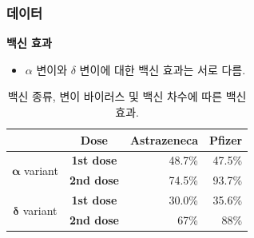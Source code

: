 \documentclass[aspectratio=169, 9pt, xcolor=dvipsnames]{beamer}
\begin{document}
	\begin{frame}\frametitle{데이터}
	    \textbf{백신 효과}
		\begin{itemize}
			\item $\alpha$ 변이와 $\delta$ 변이에 대한 백신 효과는 서로 다름.\footnotemark[1]
		\end{itemize}
		\begin{table}
			\begin{tabular}{c|crr}
				\toprule
				& \textbf{Dose} & \textbf{Astrazeneca} & \textbf{Pfizer} \\
				\midrule
				\multirow{2}{*}{$\mathbf{\alpha}$ variant} & \textbf{1st dose} & 48.7\% & 47.5\% \\
				& \textbf{2nd dose} & 74.5\% & 93.7\% \\
				\midrule
				\multirow{2}{*}{$\mathbf{\delta}$ variant} & \textbf{1st dose} & 30.0\% & 35.6\% \\
				& \textbf{2nd dose} & 67\% & 88\% \\
				\bottomrule
			\end{tabular}
			\caption{백신 종류, 변이 바이러스 및 백신 차수에 따른 백신 효과.}
		\end{table}
	\end{frame}
\end{document}
